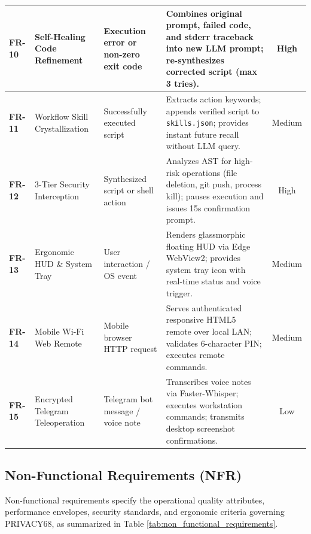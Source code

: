 \begin{table}[htbp]
\begin{tabularx}{\textwidth}{|l|p{2.8cm}|p{3.2cm}|X|c|}
\textbf{FR-10} & Self-Healing Code Refinement & Execution error or non-zero exit code & Combines original prompt, failed code, and stderr traceback into new LLM prompt; re-synthesizes corrected script (max 3 tries). & High \\ \hline
\textbf{FR-11} & Workflow Skill Crystallization & Successfully executed script & Extracts action keywords; appends verified script to \texttt{skills.json}; provides instant future recall without LLM query. & Medium \\ \hline
\textbf{FR-12} & 3-Tier Security Interception & Synthesized script or shell action & Analyzes AST for high-risk operations (file deletion, git push, process kill); pauses execution and issues 15s confirmation prompt. & High \\ \hline
\textbf{FR-13} & Ergonomic HUD \& System Tray & User interaction / OS event & Renders glassmorphic floating HUD via Edge WebView2; provides system tray icon with real-time status and voice trigger. & Medium \\ \hline
\textbf{FR-14} & Mobile Wi-Fi Web Remote & Mobile browser HTTP request & Serves authenticated responsive HTML5 remote over local LAN; validates 6-character PIN; executes remote commands. & Medium \\ \hline
\textbf{FR-15} & Encrypted Telegram Teleoperation & Telegram bot message / voice note & Transcribes voice notes via Faster-Whisper; executes workstation commands; transmits desktop screenshot confirmations. & Low \\ \hline
\end{tabularx}
\end{table}

\subsection{Non-Functional Requirements (NFR)}
Non-functional requirements specify the operational quality attributes, performance envelopes, security standards, and ergonomic criteria governing PRIVACY68, as summarized in Table \ref{tab:non_functional_requirements}.

